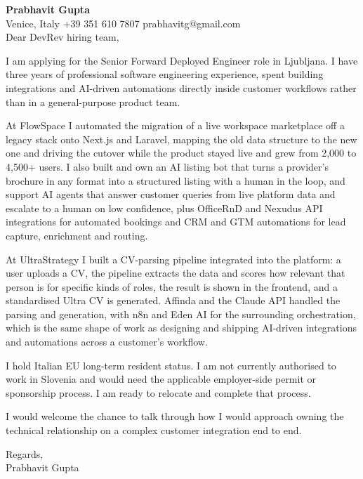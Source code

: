 \documentclass[a4paper,10.5pt]{article}
\begin{document}
\textbf{Prabhavit Gupta}\\
Venice, Italy \textbar{} +39 351 610 7807 \textbar{} prabhavitg@gmail.com\\[10pt]
Dear DevRev hiring team,

I am applying for the Senior Forward Deployed Engineer role in Ljubljana. I have three years of professional software engineering experience, spent building integrations and AI-driven automations directly inside customer workflows rather than in a general-purpose product team.

At FlowSpace I automated the migration of a live workspace marketplace off a legacy stack onto Next.js and Laravel, mapping the old data structure to the new one and driving the cutover while the product stayed live and grew from 2,000 to 4,500+ users. I also built and own an AI listing bot that turns a provider's brochure in any format into a structured listing with a human in the loop, and support AI agents that answer customer queries from live platform data and escalate to a human on low confidence, plus OfficeRnD and Nexudus API integrations for automated bookings and CRM and GTM automations for lead capture, enrichment and routing.

At UltraStrategy I built a CV-parsing pipeline integrated into the platform: a user uploads a CV, the pipeline extracts the data and scores how relevant that person is for specific kinds of roles, the result is shown in the frontend, and a standardised Ultra CV is generated. Affinda and the Claude API handled the parsing and generation, with n8n and Eden AI for the surrounding orchestration, which is the same shape of work as designing and shipping AI-driven integrations and automations across a customer's workflow.

I hold Italian EU long-term resident status. I am not currently authorised to work in Slovenia and would need the applicable employer-side permit or sponsorship process. I am ready to relocate and complete that process.

I would welcome the chance to talk through how I would approach owning the technical relationship on a complex customer integration end to end.

Regards,\\
Prabhavit Gupta
\end{document}
